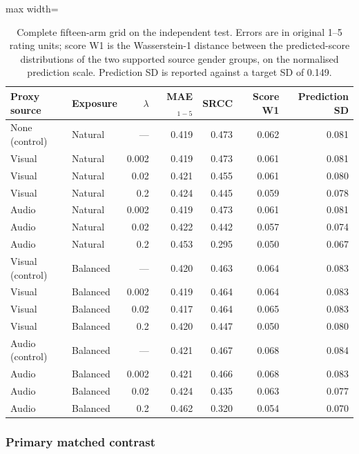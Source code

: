 \begin{table}[htbp]
\centering
\caption[Complete AVI proxy-penalty grid]{Complete fifteen-arm grid on the independent
test. Errors are in original 1--5 rating units; score W1 is the Wasserstein-1 distance
between the predicted-score distributions of the two supported source gender groups, on the
normalised prediction scale. Prediction SD is reported against a target SD of 0.149.}
\label{tab:avi-compact-arms}
\small
\begin{adjustbox}{max width=\textwidth}
\begin{tabular}{llrrrrr}
\toprule
Proxy source & Exposure & $\lambda$ & MAE$_{1-5}$ & SRCC & Score W1 & Prediction SD \\
\midrule
None (control) & Natural & --- & 0.419 & 0.473 & 0.062 & 0.081 \\
\addlinespace
Visual & Natural & 0.002 & 0.419 & 0.473 & 0.061 & 0.081 \\
Visual & Natural & 0.02 & 0.421 & 0.455 & 0.061 & 0.080 \\
Visual & Natural & 0.2 & 0.424 & 0.445 & 0.059 & 0.078 \\
Audio & Natural & 0.002 & 0.419 & 0.473 & 0.061 & 0.081 \\
Audio & Natural & 0.02 & 0.422 & 0.442 & 0.057 & 0.074 \\
Audio & Natural & 0.2 & 0.453 & 0.295 & 0.050 & 0.067 \\
\addlinespace
Visual (control) & Balanced & --- & 0.420 & 0.463 & 0.064 & 0.083 \\
Visual & Balanced & 0.002 & 0.419 & 0.464 & 0.064 & 0.083 \\
Visual & Balanced & 0.02 & 0.417 & 0.464 & 0.065 & 0.083 \\
Visual & Balanced & 0.2 & 0.420 & 0.447 & 0.050 & 0.080 \\
\addlinespace
Audio (control) & Balanced & --- & 0.421 & 0.467 & 0.068 & 0.084 \\
Audio & Balanced & 0.002 & 0.421 & 0.466 & 0.068 & 0.083 \\
Audio & Balanced & 0.02 & 0.424 & 0.435 & 0.063 & 0.077 \\
Audio & Balanced & 0.2 & 0.462 & 0.320 & 0.054 & 0.070 \\
\bottomrule
\end{tabular}
\end{adjustbox}
\end{table}
\FloatBarrier

\subsubsection{Primary matched contrast}

